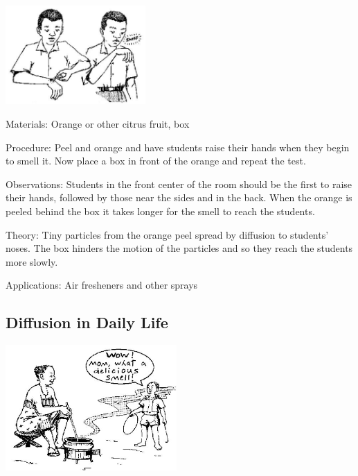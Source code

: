 \begin{multicols}{2}
\begin{center}
\includegraphics[width=0.4\textwidth]{./img/source/smelling-particles.jpg}
\end{center}

\begin{description*}
\item[Materials:]{Orange or other citrus fruit, box}
\item[Procedure:]{Peel and orange and have students raise their hands when they begin to smell it. Now place a box in front of the orange and repeat the test.}
\item[Observations:]{Students in the front center of the room should be the first to raise their hands, followed by those near the sides and in the back. When the orange is peeled behind the box it takes longer for the smell to reach the students.}
\item[Theory:]{Tiny particles from the orange peel spread by diffusion to students' noses. The box hinders the motion of the particles and so they reach the students more slowly.}
\item[Applications:]{Air fresheners and other sprays}
\end{description*}

\subsection{Diffusion in Daily Life}

\begin{center}
\includegraphics[width=0.49\textwidth]{./img/source/diffusion-life.jpg}
\end{center}


\end{multicols}
